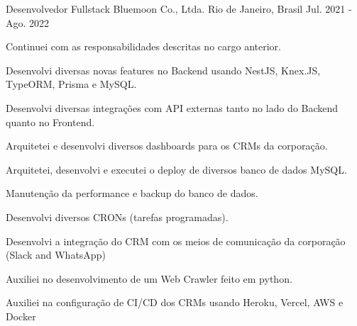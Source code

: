 \begin{cventries}
  \cventry
    {Desenvolvedor Fullstack} %
    {Bluemoon Co., Ltda.} %
    {Rio de Janeiro, Brasil} %
    {Jul. 2021 -  Ago. 2022} %
    {
      \begin{cvitems} %
        \item {Continuei com as responsabilidades descritas no cargo anterior.}
        \item {Desenvolvi diversas novas features no Backend usando NestJS, Knex.JS, TypeORM, Prisma e MySQL.}
        \item {Desenvolvi diversas integrações com API externas tanto no lado do Backend quanto no Frontend.}
        \item {Arquitetei e desenvolvi diversos dashboards para os CRMs da corporação.}
        \item {Arquitetei, desenvolvi e executei o deploy de diversos banco de dados MySQL.}
        \item {Manutenção da performance e backup do banco de dados.}
        \item {Desenvolvi diversos CRONs (tarefas programadas).}
        \item {Desenvolvi a integração do CRM com os meios de comunicação da corporação (Slack and WhatsApp)}
        \item {Auxiliei no desenvolvimento de um Web Crawler feito em python.}
        \item {Auxiliei na configuração de CI/CD dos CRMs usando Heroku, Vercel, AWS e Docker}
      \end{cvitems}
    }

\end{cventries}
